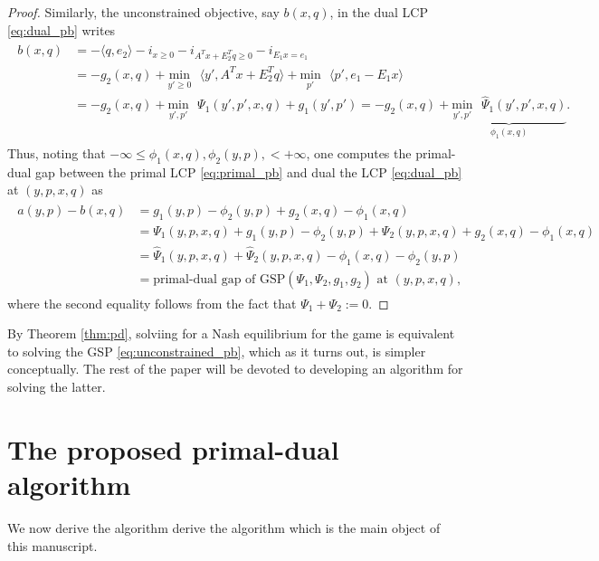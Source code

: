 \documentclass{article} %
\begin{document}
\begin{proof}
Similarly, the unconstrained objective, say
$b(x, q)$, in the dual LCP \eqref{eq:dual_pb} writes
\begin{eqnarray*}
  \begin{aligned}
 b(x, q) &= 
-\langle q, e_2\rangle -i_{x \ge 0} - i_{A^Tx+E_2^Tq \ge 0} -
 i_{E_1x = e_1}\\
 &= -g_2(x, q) + \underset{y' \geq
   0}{\text{min}}\text{ }\langle y', A^Tx + E_2^Tq\rangle +
 \underset{p'}{\text{min}}\text{ }\langle p', e_1-E_1x\rangle\\
    &= -g_2(x, q)
 +\underset{y',p'}{\text{min}}\text{ }\Psi_1(y', p', x, q) +
 g_1(y', p') = -g_2(x, q)
 +\underbrace{\underset{y',p'}{\text{min}}\text{ }\hat{\Psi}_1(y', p',
   x, q)}_{\phi_1(x, q)}.
   \end{aligned}
\end{eqnarray*}
Thus, noting that $-\infty \le \phi_1(x, q), \phi_2(y, p), < +\infty$,
one computes the primal-dual gap between the primal LCP
\eqref{eq:primal_pb} and dual the LCP \eqref{eq:dual_pb} at $(y, p, x, q)$ as
\begin{eqnarray*}
  \begin{split}
  a(y, p) - b(x, q) &= g_1(y, p) - \phi_2(y, p) + g_2(x, q) - \phi_1(x,
  q) \\
  &= \Psi_1(y, p, x, q) +  g_1(y, p) - \phi_2(y, p) + \Psi_2(y, p, x,
  q) + g_2(x, q) - \phi_1(x, q)\\
  &= \hat{\Psi}_1(y, p, x, q) + \hat{\Psi}_2(y, p, x, q) - \phi_1(x,
  q) - \phi_2(y, p)\\
  &= \text{primal-dual gap of GSP}(\Psi_1, \Psi_2,
  g_1, g_2) \text{ at }(y, p, x, q),
  \end{split}
\end{eqnarray*}
where the second equality follows from the fact that $\Psi_1 + \Psi_2
:= 0$.
\end{proof}


By Theorem \ref{thm:pd}, solviing for a Nash equilibrium for
the game is equivalent to solving the GSP
\eqref{eq:unconstrained_pb}, which as it turns out, is simpler
conceptually. The rest of the paper will be devoted to
developing an algorithm for solving the latter.



\section{The proposed primal-dual algorithm}
\label{sec:algo}
We now derive the algorithm derive the algorithm which is the main object of
this manuscript.
\end{document}
